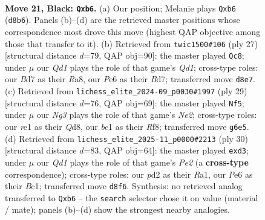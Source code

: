 \documentclass[11pt]{article}
\begin{document}
\clearpage

\begin{figure}[p]\centering
\begin{subfigure}{0.46\textwidth}\centering
\resizebox{\linewidth}{!}{%
\newchessgame
\chessboard[
  setfen={rb1qr1k1/1p1b1ppp/pP2p1n1/8/3p2P1/1P3Q1B/P2P1P1P/RNB1RK2 b - - 3 21},
  showmover=false,
  pgfstyle=straightmove, color=movearrow, markmove={d8-b6}
]}
\caption{}
\end{subfigure}\hfill
\begin{subfigure}{0.46\textwidth}\centering
\resizebox{\linewidth}{!}{%
\newchessgame
\chessboard[
  setfen={r2q1rk1/1p1bppbp/p1n3p1/P1P5/2Q5/2P2NP1/4PPBP/R1BR2K1 b - - 0 14},
  showmover=false,
  pgfstyle=straightmove, color=movearrow, markmove={d8-c8}
]}
\caption{}
\end{subfigure}
\\[4pt]
\begin{subfigure}{0.46\textwidth}\centering
\resizebox{\linewidth}{!}{%
\newchessgame
\chessboard[
  setfen={1r1q1rk1/1bp1nppp/1p2pb2/p7/2PP2QP/P4NP1/1P3PB1/R1BR2K1 b - - 0 15},
  showmover=false,
  pgfstyle=straightmove, color=movearrow, markmove={e7-f5}
]}
\caption{}
\end{subfigure}\hfill
\begin{subfigure}{0.46\textwidth}\centering
\resizebox{\linewidth}{!}{%
\newchessgame
\chessboard[
  setfen={r3r1k1/1pp2ppp/2np4/p1b2q2/2P5/PP1p2P1/4PPBP/R1BQ1RK1 w - - 0 16},
  showmover=false,
  pgfstyle=straightmove, color=movearrow, markmove={e2-d3}
]}
\caption{}
\end{subfigure}
\caption{\textbf{Move 21, Black: \texttt{Qxb6}.} (a) Our position; Melanie plays \texttt{Qxb6} (\texttt{d8b6}). Panels (b)--(d) are the retrieved master positions whose correspondence most drove this move (highest QAP objective among those that transfer to it). (b) Retrieved from \texttt{twic1500\#106} (ply 27) [structural distance $d$=79, QAP obj=90]: the master played \texttt{Qc8}; under $\mu$ our \emph{Qd1} plays the role of that game's \emph{Qd1}; cross-type roles: our \emph{B}d7 as their \emph{R}a8, our \emph{P}e6 as their \emph{B}d7; transferred move \texttt{d8e7}. (c) Retrieved from \texttt{lichess\_elite\_2024-09\_p0030\#1997} (ply 29) [structural distance $d$=76, QAP obj=69]: the master played \texttt{Nf5}; under $\mu$ our \emph{Ng3} plays the role of that game's \emph{Ne2}; cross-type roles: our \emph{r}e1 as their \emph{Q}d8, our \emph{b}c1 as their \emph{R}f8; transferred move \texttt{g6e5}. (d) Retrieved from \texttt{lichess\_elite\_2025-11\_p0000\#2213} (ply 30) [structural distance $d$=83, QAP obj=64]: the master played \texttt{exd3}; under $\mu$ our \emph{Qd1} plays the role of that game's \emph{Pe2} (a \textbf{cross-type} correspondence); cross-type roles: our \emph{p}d2 as their \emph{R}a1, our \emph{P}e6 as their \emph{B}c1; transferred move \texttt{d8f6}. Synthesis: no retrieved analog transferred to \texttt{Qxb6} -- the \texttt{search} selector chose it on value (material / mate); panels (b)--(d) show the strongest nearby analogies.}
\label{fig:thought-m41}
\end{figure}
\end{document}
